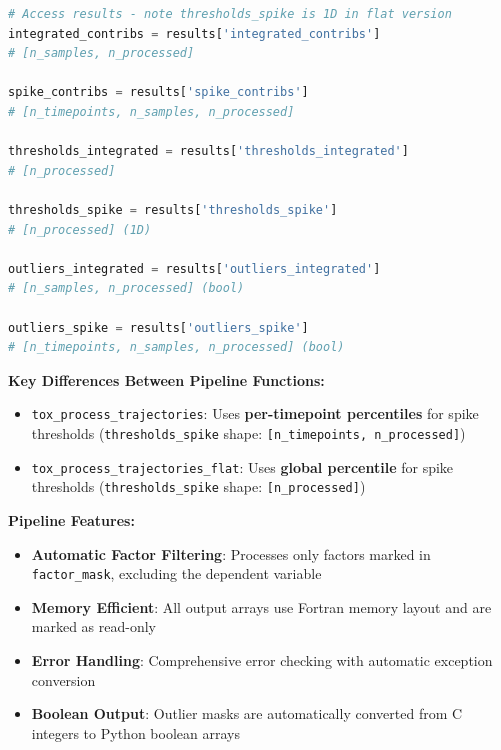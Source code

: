 \documentclass[11pt]{article}
\begin{document}
\begin{enumerate}
\begin{enumerate}
\begin{lstlisting}[language=Python, caption={Complete Trajectory Processing with Global Threshold}]
# Access results - note thresholds_spike is 1D in flat version
integrated_contribs = results['integrated_contribs']        
# [n_samples, n_processed]

spike_contribs = results['spike_contribs']                  
# [n_timepoints, n_samples, n_processed]

thresholds_integrated = results['thresholds_integrated']    
# [n_processed]

thresholds_spike = results['thresholds_spike']              
# [n_processed] (1D)

outliers_integrated = results['outliers_integrated']        
# [n_samples, n_processed] (bool)

outliers_spike = results['outliers_spike']                  
# [n_timepoints, n_samples, n_processed] (bool)
	      	      \end{lstlisting}
	      \end{enumerate}
	      
	      \textbf{Key Differences Between Pipeline Functions:}
	      \begin{itemize}
	      	\item \texttt{tox\_process\_trajectories}: Uses \textbf{per-timepoint
	      	      percentiles} for spike thresholds (\texttt{thresholds\_spike} shape: \texttt{[n\_timepoints,
	      	      n\_processed]})
	      	
	      	\item \texttt{tox\_process\_trajectories\_flat}: Uses \textbf{global
	      	      percentile} for spike thresholds (\texttt{thresholds\_spike} shape: \texttt{[n\_processed]})
	      \end{itemize}
	      
	      \textbf{Pipeline Features:}
	      \begin{itemize}
	      	\item \textbf{Automatic Factor Filtering}: Processes only factors marked
	      	      in \texttt{factor\_mask}, excluding the dependent variable
	      	      
	      	\item \textbf{Memory Efficient}: All output arrays use Fortran memory layout
	      	      and are marked as read-only
	      	      
	      	\item \textbf{Error Handling}: Comprehensive error checking with automatic
	      	      exception conversion
	      	      
	      	\item \textbf{Boolean Output}: Outlier masks are automatically converted
	      	      from C integers to Python boolean arrays
	      	      

\end{itemize}
\end{enumerate}
\end{document}

